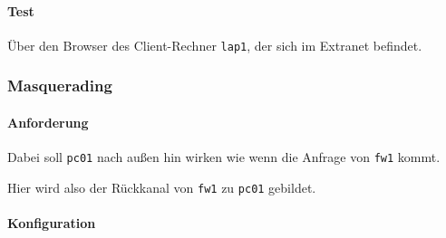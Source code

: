 \paragraph{Test} Über den Browser des Client-Rechner {\tt lap1},
der sich im Extranet befindet.


\subsubsection{Masquerading}

\paragraph{Anforderung}
Dabei soll {\tt pc01} nach außen hin wirken wie wenn die Anfrage von
{\tt fw1} kommt.

Hier wird also der Rückkanal von {\tt fw1} zu {\tt pc01} gebildet.

\paragraph{Konfiguration}

